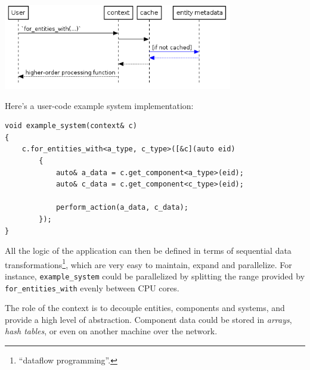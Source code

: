 \documentclass[twoside, 12pt, a4paper, openany]{book}
\let\origfigure=\figure
\let\endorigfigure=\endfigure
\renewenvironment{figure}[1][]{%
\origfigure[H]
}{%
\endorigfigure
}
\begin{document}
\begin{figure}[htbp]
\centering
\includegraphics[width=0.75000\textwidth]{source/figures/generated/ecs/overview/dod_composition/uml_context_for_entities_with.png}
\caption{DOD: retrieving entities matching a component type set through
context object}
\end{figure}

Here's a user-code example system implementation:

\begin{verbatim}
void example_system(context& c)
{
    c.for_entities_with<a_type, c_type>([&c](auto eid)
        {
            auto& a_data = c.get_component<a_type>(eid);
            auto& c_data = c.get_component<c_type>(eid);

            perform_action(a_data, c_data);
        });
}
\end{verbatim}

All the logic of the application can then be defined in terms of
sequential data transformations\footnote{``dataflow programming''.},
which are very easy to maintain, expand and parallelize. For instance,
\texttt{example_system}
could be parallelized by splitting the range provided by
\texttt{for_entities_with}
evenly between CPU cores.

The role of the context is to decouple entities, components and systems,
and provide a high level of abstraction. Component data could be stored
in \emph{arrays}, \emph{hash tables}, or even on another machine over
the network.
\end{document}
